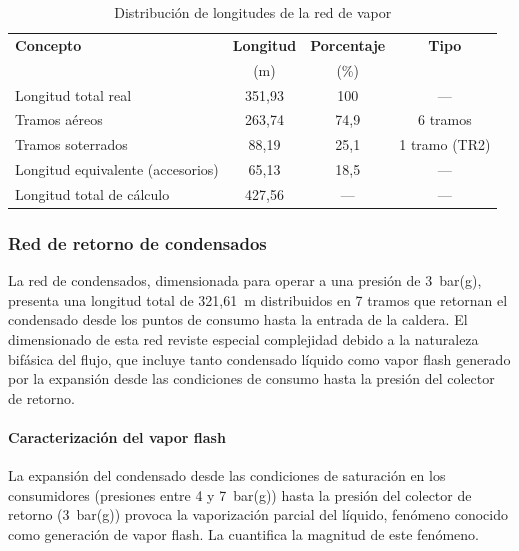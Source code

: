 \begin{table}[H]
	\centering
	\caption{Distribución de longitudes de la red de vapor}
	\label{tab:conclusiones-longitudes-vapor}
	\begin{tabular}{lccc}
		\toprule
		\textbf{Concepto}                 & \textbf{Longitud} & \textbf{Porcentaje} & \textbf{Tipo} \\
		                                  & (m)               & (\%)                &               \\
		\midrule
		Longitud total real               & 351,93            & 100                 & ---           \\
		Tramos aéreos                     & 263,74            & 74,9                & 6 tramos      \\
		Tramos soterrados                 & 88,19             & 25,1                & 1 tramo (TR2) \\
		\midrule
		Longitud equivalente (accesorios) & 65,13             & 18,5                & ---           \\
		Longitud total de cálculo         & 427,56            & ---                 & ---           \\
		\bottomrule
	\end{tabular}
\end{table}

\subsubsection{Red de retorno de condensados}
\label{subsubsec:conclusiones-red-condensados}

La red de condensados, dimensionada para operar a una presión de 3~bar(g), presenta una longitud total de 321,61~m distribuidos en 7 tramos que retornan el condensado desde los puntos de consumo hasta la entrada de la caldera. El dimensionado de esta red reviste especial complejidad debido a la naturaleza bifásica del flujo, que incluye tanto condensado líquido como vapor flash generado por la expansión desde las condiciones de consumo hasta la presión del colector de retorno.

\paragraph{Caracterización del vapor flash}

La expansión del condensado desde las condiciones de saturación en los consumidores (presiones entre 4 y 7~bar(g)) hasta la presión del colector de retorno (3~bar(g)) provoca la vaporización parcial del líquido, fenómeno conocido como generación de vapor flash. La  cuantifica la magnitud de este fenómeno.

